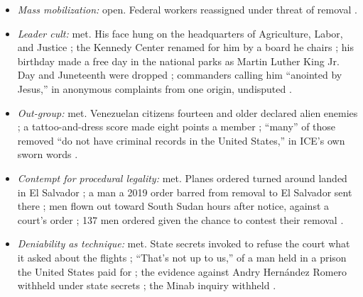 \begin{itemize}
\item \emph{Mass mobilization:} open. Federal workers reassigned under threat of removal \autocite{Dayen2025FEMAICE,Stanton2026FEMALetter}.
\item \emph{Leader cult:} met. His face hung on the headquarters of Agriculture, Labor, and Justice \autocite{walrath2026banners,barry2025laborbanner}; the Kennedy Center renamed for him by a board he chairs \autocite{ap2025kennedy}; his birthday made a free day in the national parks as Martin Luther King Jr. Day and Juneteenth were dropped \autocite{marquez2025parks}; commanders calling him “anointed by Jesus,” in anonymous complaints from one origin, undisputed \autocite{Larsen2026Armageddon,Snopes2026MRFF}.
\item \emph{Out-group:} met. Venezuelan citizens fourteen and older declared alien enemies \autocite{procl10903}; a tattoo-and-dress score made eight points a member \autocite{MartinezBeltran2025Validation}; “many” of those removed “do not have criminal records in the United States,” in ICE's own sworn words \autocite{garcia2025cerna}.
\item \emph{Contempt for procedural legality:} met. Planes ordered turned around landed in El Salvador \autocite{jgg2025contempt,thanawala2025contempt}; a man a 2019 order barred from removal to El Salvador sent there \autocite{rosen2025abrego}; men flown out toward South Sudan hours after notice, against a court's order \autocite{whitehurst2025southsudan}; 137 men ordered given the chance to contest their removal \autocite{thanawala2026cecot}.
\item \emph{Deniability as technique:} met. State secrets invoked to refuse the court what it asked about the flights \autocite{kunzelman2025secrets}; “That's not up to us,” of a man held in a prison the United States paid for \autocite{pbs2025bukele,Renteria2025ElSalvador}; the evidence against Andry Hernández Romero withheld under state secrets \autocite{Vega2025HernandezRomero}; the Minab inquiry withheld \autocite{Bloomberg2026KillChain,stassis2026senate}.
\end{itemize}
